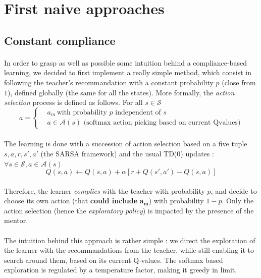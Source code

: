 \documentclass[a4paper]{report}
\begin{document}
{	\section{First naive approaches}
	{
		\subsection{Constant compliance}
		{
			\paragraph{} In order to grasp as well as possible some intuition behind a compliance-based learning, we decided to first implement a really simple method, which consist in following the teacher's recommandation with a constant probability $p$ (close from $1$), defined globally (the same for all the states). More formally, the \emph{action selection} process is defined as follows. For all $s\in\mathcal{S}$ 
			\begin{equation}
				a = \left\{
				\begin{aligned}
					&a_m \, \text{with probability }p  \text{ independent of } s\\
					& a \in \mathcal{A}(s) \text{ (softmax action picking based on current Qvalues)}
				\end{aligned}\right.
			\end{equation}
			
			\paragraph{} The learning is done with a succession of action selection based on a five tuple $s,a,r,s',a'$ (the SARSA framework) and the usual TD(0) updates : $\forall s\in\mathcal{S}, a\in\mathcal{A}(s)$
			\begin{equation}
				Q(s,a) \leftarrow Q(s,a) + \alpha \left[ r + Q(s',a') - Q(s,a) \right]
			\end{equation}
			
			\paragraph{} Therefore, the learner \emph{complies} with the teacher with probability $p$, and decide to choose its own action (that \textbf{could include} $\pmb{a_m}$) with probability $1-p$. Only the action selection (hence the \emph{exploratory policy}) is impacted by the presence of the mentor. 
			
			\paragraph{} The intuition behind this approach is rather simple : we direct the exploration of the learner with the recommandations from the teacher, while still enabling it to search around them, based on its current Q-values. The softmax based exploration is regulated by a temperature factor, making it greedy in limit. 
			
}}}
\end{document}
